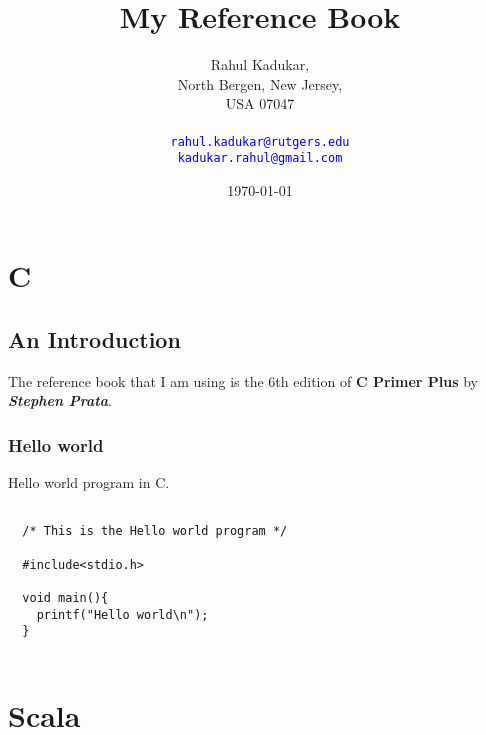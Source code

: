 \documentclass[11pt,a4paper,oneside]{book}
\begin{document}
\title{My Reference Book}
\author{
Rahul Kadukar, \\
North Bergen, New Jersey, \\
USA 07047 \\
\\
\texttt{\textcolor{blue}{rahul.kadukar@rutgers.edu}} \\
\texttt{\textcolor{blue}{kadukar.rahul@gmail.com}}
}
\date{\today}
\maketitle
\begingroup
\let\cleardoublepage\clearpage
\tableofcontents
\endgroup

\part{C}
\chapter{An Introduction}
The reference book that I am using is the 6th edition of \textbf{C Primer Plus}
by \textit{\textbf {Stephen Prata}}.
\section{Hello world}
Hello world program in C.
\noindent \begin{lstlisting}[title=Hello world program]
  
  /* This is the Hello world program */

  #include<stdio.h>
  
  void main(){
    printf("Hello world\n");
  }
  
\end{lstlisting}

\part{Scala}
\setcounter{chapter}{0}
\end{document}
